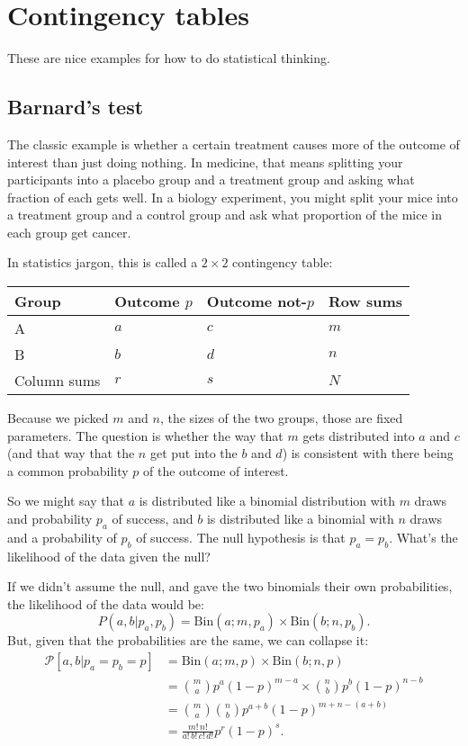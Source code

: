 \documentclass{book}
\begin{document}
\section{Contingency tables}\label{contingency-tables}

These are nice examples for how to do statistical thinking.

\subsection{Barnard's test}\label{barnards-test}

The classic example is whether a certain treatment causes more of the
outcome of interest than just doing nothing. In medicine, that means
splitting your participants into a placebo group and a treatment group
and asking what fraction of each gets well. In a biology experiment, you
might split your mice into a treatment group and a control group and ask
what proportion of the mice in each group get cancer.

In statistics jargon, this is called a \(2 \times 2\) contingency table:

\begin{longtable}[]{@{}llll@{}}
\toprule
Group & Outcome \(p\) & Outcome not-\(p\) & Row sums\tabularnewline
\midrule
\endhead
A & \(a\) & \(c\) & \(m\)\tabularnewline
B & \(b\) & \(d\) & \(n\)\tabularnewline
Column sums & \(r\) & \(s\) & \(N\)\tabularnewline
\bottomrule
\end{longtable}

Because we picked \(m\) and \(n\), the sizes of the two groups, those
are fixed parameters. The question is whether the way that \(m\) gets
distributed into \(a\) and \(c\) (and that way that the \(n\) get put
into the \(b\) and \(d\)) is consistent with there being a common
probability \(p\) of the outcome of interest.

So we might say that \(a\) is distributed like a binomial distribution
with \(m\) draws and probability \(p_a\) of success, and \(b\) is
distributed like a binomial with \(n\) draws and a probability of
\(p_b\) of success. The null hypothesis is that \(p_a = p_b\). What's
the likelihood of the data given the null?

If we didn't assume the null, and gave the two binomials their own
probabilities, the likelihood of the data would be: \[
P(a, b | p_a, p_b) = \mathrm{Bin}(a; m, p_a) \times \mathrm{Bin}(b; n, p_b).
\] But, given that the probabilities are the same, we can collapse it:
\[
\begin{aligned}
\mathcal{P}[a, b | p_a = p_b = p] &= \mathrm{Bin}(a; m, p) \times \mathrm{Bin}(b; n, p) \\
  &= \binom{m}{a} p^a (1-p)^{m-a} \times \binom{n}{b} p^b (1-p)^{n-b} \\
  &= \binom{m}{a} \binom{n}{b} p^{a+b} (1-p)^{m+n-(a+b)} \\
  &= \frac{m! \, n!}{a! \, b! \, c! \, d!} p^r (1-p)^s.
\end{aligned}
\]
\end{document}

